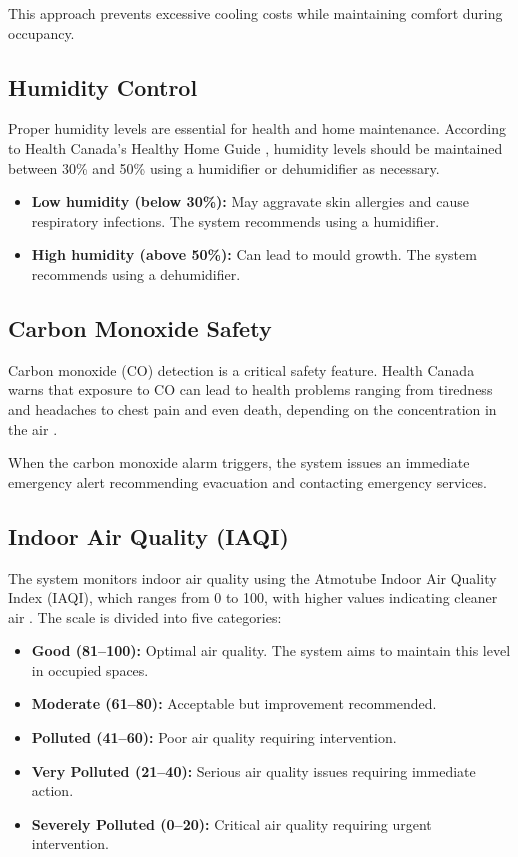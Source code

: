 \documentclass{article}
\begin{document}
This approach prevents excessive cooling costs while maintaining comfort during occupancy.

\subsection{Humidity Control}

Proper humidity levels are essential for health and home maintenance. According to Health Canada's Healthy Home Guide \cite{health_canada_home}, humidity levels should be maintained between 30\% and 50\% using a humidifier or dehumidifier as necessary.

\begin{itemize}
    \item \textbf{Low humidity (below 30\%):} May aggravate skin allergies and cause respiratory infections. The system recommends using a humidifier.
    \item \textbf{High humidity (above 50\%):} Can lead to mould growth. The system recommends using a dehumidifier.
\end{itemize}

\subsection{Carbon Monoxide Safety}

Carbon monoxide (CO) detection is a critical safety feature. Health Canada warns that exposure to CO can lead to health problems ranging from tiredness and headaches to chest pain and even death, depending on the concentration in the air \cite{health_canada_home}.

When the carbon monoxide alarm triggers, the system issues an immediate emergency alert recommending evacuation and contacting emergency services.

\subsection{Indoor Air Quality (IAQI)}

The system monitors indoor air quality using the Atmotube Indoor Air Quality Index (IAQI), which ranges from 0 to 100, with higher values indicating cleaner air \cite{atmotube_iaqi}. The scale is divided into five categories:

\begin{itemize}
    \item \textbf{Good (81--100):} Optimal air quality. The system aims to maintain this level in occupied spaces.
    \item \textbf{Moderate (61--80):} Acceptable but improvement recommended.
    \item \textbf{Polluted (41--60):} Poor air quality requiring intervention.
    \item \textbf{Very Polluted (21--40):} Serious air quality issues requiring immediate action.
    \item \textbf{Severely Polluted (0--20):} Critical air quality requiring urgent intervention.
\end{itemize}
\end{document}
